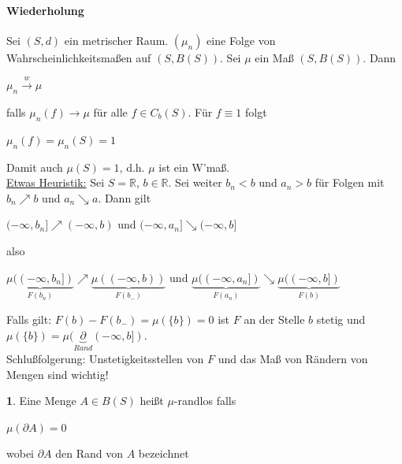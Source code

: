 \documentclass[10pt,a4paper]{report}
\newcommand{\R}{\mathbb{R}}
\numberwithin{equation}{section}
\numberwithin{figure}{section}
\theoremstyle{plain}
\theoremstyle{definition}
\newtheorem{defn}[thm]{\protect\definitionname}
\theoremstyle{remark}
\theoremstyle{plain}
\providecommand{\definitionname}{Definition}
\newcommand{\1}{ \mathbb{1} } %
\begin{document}
\paragraph{Wiederholung}
Sei $(S,d)$ ein metrischer Raum. $(\mu_n)$ eine Folge von Wahrscheinlichkeitsmaßen auf $(S,B(S))$. Sei $\mu$ ein Maß $(S,B(S))$. Dann
\begin{center}
$\mu_n \overset{w}{\to} \mu$
\end{center}
falls $\mu_n(f) \to \mu$ für alle $f \in C_b(S)$. Für $f \equiv 1$ folgt
\begin{center}
$\mu_n(f)=\mu_n(S)=1$
\end{center}
Damit auch $\mu(S)=1$, d.h. $\mu$ ist ein W'maß.\\
\underline{Etwas Heuristik:} 
Sei $S=\R$, $b \in \R$. Sei weiter $b_n <b$ und $a_n>b$ für Folgen mit $b_n\nearrow b$ und $a_n \searrow a$. Dann gilt
\begin{center}
$(-\infty,b_n] \nearrow (-\infty,b)$ und $(-\infty,a_n] \searrow (-\infty,b]$
\end{center}
also 
\begin{center}
$\underbrace{\mu((-\infty,b_n])}_{F(b_n)} \nearrow \underbrace{\mu((-\infty,b))}_{F(b_-)}$ und $\underbrace{\mu((-\infty,a_n])}_{F(a_n)} \searrow \underbrace{\mu((-\infty,b])}_{F(b)}$
\end{center}
Falls gilt: $F(b)-F(b_-)=\mu(\{b\})=0$ ist $F$ an der Stelle $b$ stetig und $\mu(\{b\})=\mu(\underbrace{\partial}_{Rand}(-\infty,b])$.\\
Schlußfolgerung: Unstetigkeitsstellen von $F$ und das Maß von Rändern von Mengen sind wichtig!
\begin{defn}
  Eine Menge $A \in B(S)$ heißt $\mu$-randlos falls
  \begin{center}
    $\mu(\partial A)=0$ 
  \end{center}
  wobei $\partial A$ den Rand von $A$ bezeichnet
\end{defn}
\end{document}
